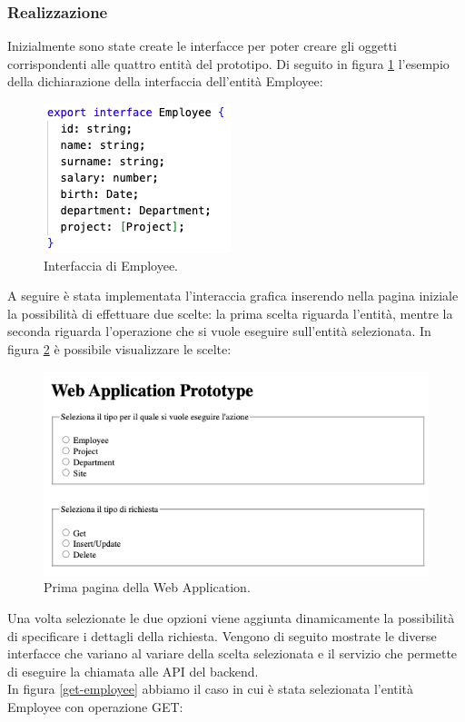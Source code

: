 \subsubsection*{Realizzazione}
Inizialmente sono state create le interfacce per poter creare gli oggetti corrispondenti alle quattro entità del prototipo. Di seguito in figura \ref{employee-interface} l'esempio della dichiarazione della interfaccia dell'entità Employee:
\FloatBarrier
\begin{figure}[!ht]
\centering
\includegraphics[width=0.3\linewidth]{immagini/employeeInterface.png}
\caption{Interfaccia di Employee.}
\label{employee-interface}
\end{figure}
\FloatBarrier
A seguire è stata implementata l'interaccia grafica inserendo nella pagina iniziale la possibilità di effettuare due scelte: la prima scelta riguarda l'entità, mentre la seconda riguarda l'operazione che si vuole eseguire sull'entità selezionata. In figura \ref{first-page} è possibile visualizzare le scelte:
\FloatBarrier
\begin{figure}[!ht]
\centering
\includegraphics[width=0.7\linewidth]{immagini/firstPage.png}
\caption{Prima pagina della Web Application.}
\label{first-page}
\end{figure}
\FloatBarrier
Una volta selezionate le due opzioni viene aggiunta dinamicamente la possibilità di specificare i dettagli della richiesta. Vengono di seguito mostrate le diverse interfacce che variano al variare della scelta selezionata e il servizio che permette di eseguire la chiamata alle API del backend.\\
In figura \ref{get-employee} abbiamo il caso in cui è stata selezionata l'entità Employee con operazione GET:
